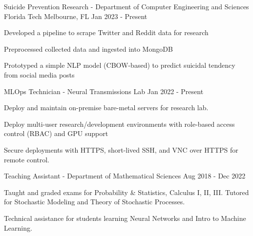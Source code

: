 \vspace{-4mm}
\vspace{-2mm}
\begin{cventries}

	\cventry
	{Suicide Prevention Research - Department of Computer Engineering and Sciences}
	{Florida Tech}
	{Melbourne, FL}
	{Jan 2023 - Present}
	{\begin{cvitems}
			\item {Developed a pipeline to scrape Twitter and Reddit data for research}
			\item {Preprocessed collected data and ingested into MongoDB}
			\item {Prototyped a simple NLP model (CBOW-based) to predict suicidal tendency from social media posts}
		\end{cvitems}}

	\vspace{-2mm}

	\cventry
	{MLOps Technician - Neural Transmissions Lab}
	{}
	{}
	{Jan 2022 - Present}
	{\begin{cvitems}
			\item {Deploy and maintain on-premise bare-metal servers for research lab.}
			\item {Deploy multi-user research/development environments with role-based access control (RBAC) and GPU support}
			\item {Secure deployments with HTTPS, short-lived SSH, and VNC over HTTPS for remote control.}
		\end{cvitems}}

	\vspace{-2mm}

	\cventry
	{Teaching Assistant - Department of Mathematical Sciences}
	{}
	{}
	{Aug 2018 - Dec 2022}
	{\begin{cvitems}
			\item {Taught and graded exams for Probability \& Statistics, Calculus I, II, III. Tutored for Stochastic Modeling and Theory of Stochastic Processes.}
			\item {Technical assistance for students learning Neural Networks and Intro to Machine Learning.}
		\end{cvitems}}


\end{cventries}

